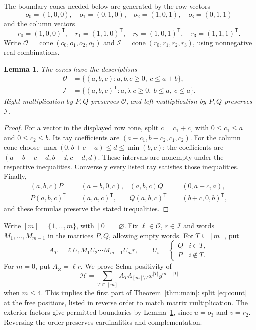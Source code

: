 \documentclass[11pt]{article}
\newtheorem{lemma}[theorem]{Lemma}
\newcommand{\cO}{\mathcal O}
\newcommand{\cI}{\mathcal I}
\DeclareMathOperator{\cone}{cone}
\begin{document}
The boundary cones needed below are generated by the row vectors
\[
 o_0=(1,0,0),\quad o_1=(0,1,0),\quad
 o_2=(1,0,1),\quad o_3=(0,1,1)
\]
and the column vectors
\[
 r_0=(1,0,0)^{\mathsf T},\quad r_1=(1,1,0)^{\mathsf T},\quad
 r_2=(1,0,1)^{\mathsf T},\quad r_3=(1,1,1)^{\mathsf T}.
\]
Write $\cO=\cone(o_0,o_1,o_2,o_3)$ and
$\cI=\cone(r_0,r_1,r_2,r_3)$, using nonnegative real combinations.

\begin{lemma}\label{lem:cones}
The cones have the descriptions
\begin{align*}
 \cO&=\{(a,b,c):a,b,c\ge0,\ c\le a+b\},\\
 \cI&=\{(a,b,c)^{\mathsf T}:a,b,c\ge0,\ b\le a,\ c\le a\}.
\end{align*}
Right multiplication by $P,Q$ preserves $\cO$, and left multiplication
by $P,Q$ preserves $\cI$.
\end{lemma}
\begin{proof}
For a vector in the displayed row cone, split $c=c_1+c_2$ with
$0\le c_1\le a$ and $0\le c_2\le b$. Its ray coefficients are
$(a-c_1,b-c_2,c_1,c_2)$.
For the column cone choose
$\max(0,b+c-a)\le d\le\min(b,c)$; the coefficients are
$(a-b-c+d,b-d,c-d,d)$. These intervals are nonempty under the respective
inequalities. Conversely every listed ray satisfies those inequalities.
Finally,
\begin{align*}
 (a,b,c)P&=(a+b,0,c),& (a,b,c)Q&=(0,a+c,a),\\
 P(a,b,c)^{\mathsf T}&=(a,a,c)^{\mathsf T},&
 Q(a,b,c)^{\mathsf T}&=(b+c,0,b)^{\mathsf T},
\end{align*}
and these formulas preserve the stated inequalities.
\end{proof}

Write $[m]=\{1,\ldots,m\}$, with $[0]=\varnothing$.
Fix $\ell\in\cO$, $r\in\cI$ and words $M_1,\ldots,M_{m-1}$
in the matrices $P,Q$, allowing empty words. For $T\subseteq[m]$, put
\begin{equation}\label{eq:AT}
 A_T=\ell U_1M_1U_2\cdots M_{m-1}U_mr,
 \qquad U_i=\begin{cases}Q&i\in T,\\P&i\notin T.\end{cases}
\end{equation}
For $m=0$, put $A_\varnothing=\ell r$.
We prove Schur positivity of
\begin{equation}\label{eq:matrixH}
 \mathcal H=\sum_{T\subseteq[m]}A_TA_{[m]\setminus T}x^{|T|}y^{m-|T|}
\end{equation}
when $m\le4$. This implies the first part of Theorem~\ref{thm:main}:
split \eqref{eq:count} at the free positions, listed in reverse order
to match matrix multiplication. The exterior factors give permitted
boundaries by Lemma~\ref{lem:cones}, since $u=o_3$ and $v=r_2$.
Reversing the order preserves cardinalities and complementation.
\end{document}

